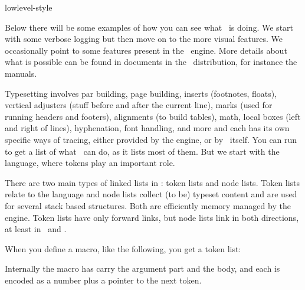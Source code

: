 

\environment lowlevel-style



\appendtoks\showmakeup[reset]\to\everybeforeoutput

\usebodyfont[dejavu]
\usebodyfont[pagella]

\startdocument
  [title=debugging,
   color=darkgray]

\startsectionlevel[title=Introduction]

Below there will be some examples of how you can see what \TEX\ is doing. We
start with some verbose logging but then move on to the more visual features. We
occasionally point to some features present in the \LUAMETATEX\ engine. More
details about what is possible can be found in documents in the \CONTEXT\
distribution, for instance the  manuals.

Typesetting involves par building, page building, inserts (footnotes, floats),
vertical adjusters (stuff before and after the current line), marks (used for
running headers and footers), alignments (to build tables), math, local boxes
(left and right of lines), hyphenation, font handling, and more and each has its
own specific ways of tracing, either provided by the engine, or by \CONTEXT\
itself. You can run  to get a list of what \CONTEXT\ can
do, as it lists most of them. But we start with the language, where tokens play
an important role.

\stopsectionlevel

\startsectionlevel[title=Token lists]

There are two main types of linked lists in \TEX: token lists and node lists.
Token lists relate to the language and node lists collect (to be) typeset content
and are used for several stack based structures. Both are efficiently memory
managed by the engine. Token lists have only forward links, but node lists link
in both directions, at least in \LUATEX\ and \LUAMETATEX.

When you define a macro, like the following, you get a token list:

\startbuffer
\def\test#1{\bgroup\bf#1\egroup}
\stopbuffer

\typebuffer \getbuffer

Internally the \type {\test} macro has carry the argument part and the body,
and each is encoded as a number plus a pointer to the next token.

